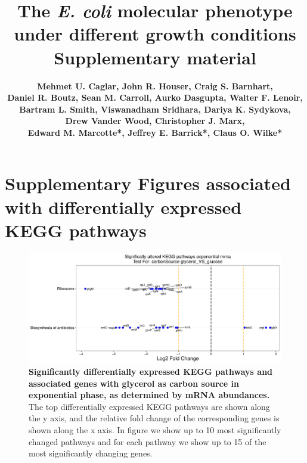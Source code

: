 \documentclass[a4paper]{article}
\title{\huge\bfseries \vspace{2cm} The \textit{E. coli} molecular phenotype under different growth conditions \\ \vspace{0.7cm}
	\Large\bfseries Supplementary material \vspace{1.3cm}}
\author{
	\large\bfseries Mehmet U. Caglar, John R. Houser, Craig S. Barnhart, \\
	\large\bfseries Daniel R. Boutz, Sean M. Carroll, Aurko Dasgupta, Walter F. Lenoir,\\ 
	\large\bfseries Bartram L. Smith, Viswanadham Sridhara, Dariya K. Sydykova, \\
	\large\bfseries Drew Vander Wood, Christopher J. Marx, \\
	\large\bfseries Edward M. Marcotte*, Jeffrey E. Barrick*, Claus O. Wilke*}
\begin{document}
\maketitle
\newpage
	
	
	
\tableofcontents
\listoffigures
\listoftables

\newpage


\section*{Supplementary Figures associated with differentially expressed KEGG pathways}
\begin{figure}[!htb]
	\includegraphics[width=1.0\textwidth]{../../d_figures/kegg_01.pdf}
	\caption[Significantly altered KEGG pathways for mRNA samples in exponential phase tested for glycerol against glucose]
	{\textbf{Significantly differentially expressed KEGG pathways and associated genes with glycerol as carbon source in exponential phase, as determined by mRNA abundances.} The top differentially expressed KEGG pathways are shown along the y axis, and the relative fold change of the corresponding genes is shown along the x axis. In figure we show up to 10 most significantly changed pathways and for each pathway we show up to 15 of the most significantly changing genes.}
\end{figure}
\end{document}
